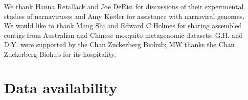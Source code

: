 \documentclass[unnumsec,webpdf,contemporary,large,namedate]{oup-authoring-template}%
\theoremstyle{thmstyleone}%
\theoremstyle{thmstyletwo}%
\theoremstyle{thmstylethree}%
\begin{document}
We thank Hanna Retallack and Joe DeRisi for discussions of their experimental studies of narnaviruses
and Amy Kistler for assistance with narnaviral genomes.
We would like to thank Mang Shi and Edward C Holmes for sharing assembled contigs from Australian and Chinese mosquito metagenomic datasets.
G.H. and D.Y. were supported by the Chan Zuckerberg Biohub;
MW thanks the Chan Zuckerberg Biohub for its hospitality.

\section{Data availability}






%
%
\end{document}
